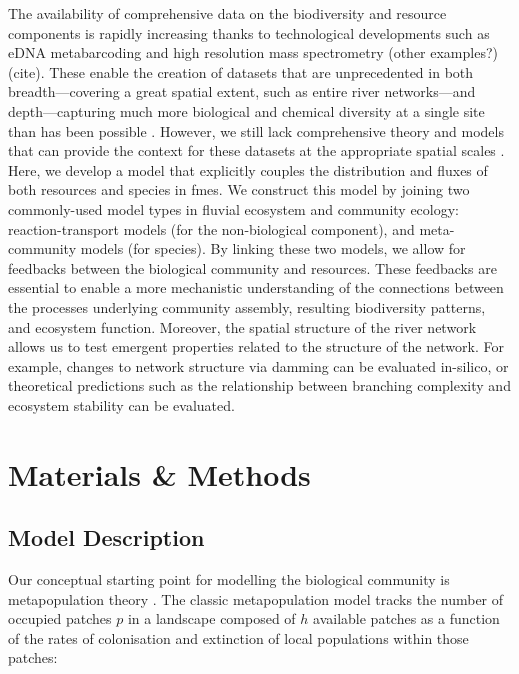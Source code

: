 \begin{itemize}
		{The availability of comprehensive data on the biodiversity and resource components is rapidly increasing thanks to technological developments such as eDNA metabarcoding and high resolution mass spectrometry (other examples?) (cite).
		These enable the creation of datasets that are unprecedented in both breadth---covering a great spatial extent, such as entire river networks---and depth---capturing much more biological and chemical diversity at a single site than has been possible \autocite{Altermatt2020}.
		However, we still lack comprehensive theory and models that can provide the context for these datasets at the appropriate spatial scales \autocite{Gounand2018}.}
		{Here, we develop a model that explicitly couples the distribution and fluxes of both resources and species in \acp{fme}.
		We construct this model by joining two commonly-used model types in fluvial ecosystem and community ecology: reaction-transport models (for the non-biological component), and meta-community models (for species).
		By linking these two models, we allow for feedbacks between the biological community and resources.
		These feedbacks are essential to enable a more mechanistic understanding of the connections between the processes underlying community assembly, resulting biodiversity patterns, and ecosystem function.
		Moreover, the spatial structure of the river network allows us to test emergent properties related to the structure of the network.
		For example, changes to network structure via damming can be evaluated in-silico, or theoretical predictions such as the relationship between branching complexity and ecosystem stability \autocite{Terui2018} can be evaluated.}
\end{itemize}


\section{Materials \& Methods}

\subsection{Model Description}

Our conceptual starting point for modelling the biological community is metapopulation theory \autocite{Levins1969}.
The classic metapopulation model tracks the number of occupied patches $p$ in a landscape composed of $h$ available patches as a function of the rates of colonisation and extinction of local populations within those patches:


